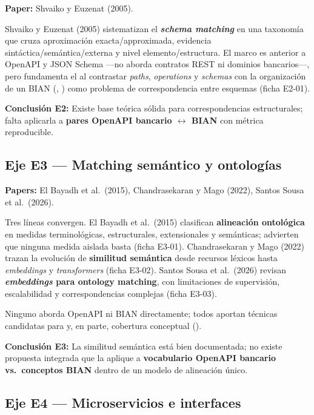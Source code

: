 \textbf{Paper:} Shvaiko y Euzenat (2005).

Shvaiko y Euzenat (2005) sistematizan el \textbf{\textit{schema matching}} en una taxonomía que
cruza aproximación exacta/approximada, evidencia sintáctica/semántica/externa y nivel
elemento/estructura. El marco es anterior a OpenAPI y JSON Schema ---no aborda contratos REST ni
dominios bancarios---, pero fundamenta el \StructuralScore{} al contrastar \textit{paths},
\textit{operations} y \textit{schemas} con la organización de un \ServiceDomain{} BIAN
(\Behavior{}, \BusinessObject{}) como problema de correspondencia entre esquemas (ficha E2-01).

\textbf{Conclusión E2:} Existe base teórica sólida para correspondencias estructurales; falta
aplicarla a \textbf{pares OpenAPI bancario $\leftrightarrow$ BIAN} con métrica reproducible.

\subsection{Eje E3 --- Matching semántico y ontologías}

\textbf{Papers:} El Bayadh et al.\ (2015), Chandrasekaran y Mago (2022), Santos Sousa et al.\ (2026).

Tres líneas convergen. El Bayadh et al.\ (2015) clasifican \textbf{alineación ontológica} en medidas
terminológicas, estructurales, extensionales y semánticas; advierten que ninguna medida aislada basta
(ficha E3-01). Chandrasekaran y Mago (2022) trazan la evolución de \textbf{similitud semántica}
desde recursos léxicos hasta \textit{embeddings} y \textit{transformers} (ficha E3-02). Santos Sousa
et al.\ (2026) revisan \textbf{\textit{embeddings} para ontology matching}, con limitaciones de
supervisión, escalabilidad y correspondencias complejas (ficha E3-03).

Ninguno aborda OpenAPI ni BIAN directamente; todos aportan técnicas candidatas para
\SemanticScore{} y, en parte, cobertura conceptual (\CoverageScore{}).

\textbf{Conclusión E3:} La similitud semántica está bien documentada; no existe propuesta integrada
que la aplique a \textbf{vocabulario OpenAPI bancario vs.\ conceptos BIAN} dentro de un modelo de
alineación único.

\subsection{Eje E4 --- Microservicios e interfaces}

